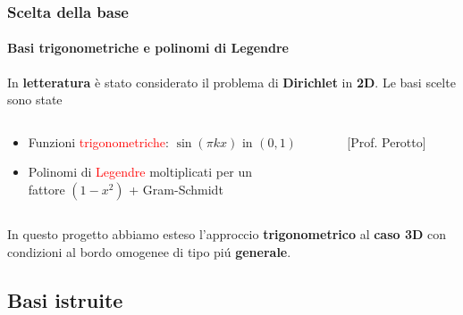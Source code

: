 \begin{frame}
 \frametitle{Scelta della base}
 \framesubtitle{Basi trigonometriche e polinomi di Legendre}
 In \textbf{letteratura} \`e stato considerato il problema di \textbf{Dirichlet} in \textbf{2D}.
 Le basi scelte sono state
 \begin{columns}
 \begin{column}{0.7\textwidth}
 \begin{itemize}
  \item Funzioni \textcolor{red}{trigonometriche}: $\sin(\pi k x)\text{ in }(0,1)$ 
  \item Polinomi di \textcolor{red}{Legendre} moltiplicati per un \\fattore $(1-x^2)$ + Gram-Schmidt 
 \end{itemize}
 \end{column}
 \begin{column}{0.3\textwidth}
 \footnotesize
  [Prof. Perotto]
  \vspace{0.45cm}
  
 \end{column}
 \end{columns}
\begin{alertblock}{In questo progetto}
 abbiamo esteso l'approccio \textbf{trigonometrico} al \textbf{caso 3D} con condizioni al bordo omogenee di tipo pi\'u \textbf{generale}.
\end{alertblock}

\end{frame}

 
\subsection{Basi istruite}

